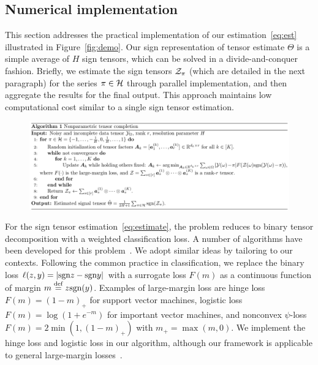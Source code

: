 \documentclass{article}
\theoremstyle{plain}
\theoremstyle{definition}
\def\sign{\textup{sgn}}
\begin{document}
\subsection{Numerical implementation}
This section addresses the practical implementation of our estimation~\eqref{eq:est} illustrated in Figure~\ref{fig:demo}. Our sign representation of tensor estimate $\Theta$ is a simple average of $H$ sign tensors, which can be solved in a divide-and-conquer fashion. Briefly, we estimate the sign tensors $\mathcal{Z}_\pi$ (which are detailed in the next paragraph) for the series $\pi \in \mathcal{H}$ through parallel implementation, and then aggregate the results for the final output. This approach maintains low computational cost similar to a single sign tensor estimation.  

\begin{figure}[h!]
\vspace{-.4cm}
\includegraphics[width=\textwidth]{figure/algorithm.pdf}
\vspace{-.8cm}
\end{figure}


For the sign tensor estimation~\eqref{eq:estimate}, the problem reduces to binary tensor decomposition with a weighted classification loss. A number of algorithms have been developed for this problem~\cite{ghadermarzy2018learning,wang2018learning,hong2020generalized}. We adopt similar ideas by tailoring to our contexts. Following the common practice in classification, we replace the binary loss $\ell(z,y)=|\sign z - \sign y|$ with a surrogate loss $F(m)$ as a continuous function of margin $m\stackrel{\text{def}}{=}z\sign(y)$. Examples of large-margin loss are hinge loss $F(m) = (1-m)_+$ for support vector machines, logistic loss $F(m) =\log(1+e^{-m})$ for important vector machines, and nonconvex $\psi$-loss $F(m)=2\min(1,(1-m)_+)$ with $m_{+}=\max(m,0)$. We implement the hinge loss and logistic loss in our algorithm, although our framework is applicable to general large-margin losses~\citep{bartlett2006convexity}. 
\end{document}
